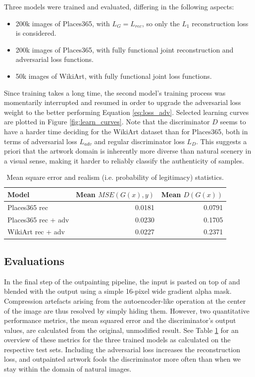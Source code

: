 \documentclass[twocolumn,showpacs,%
  nofootinbib,aps,superscriptaddress,%
  eqsecnum,prd,notitlepage,showkeys,10pt]{revtex4-1}
\begin{document}
\hspace{\parindent} Three models were trained and evaluated, differing in the following aspects:
\begin{itemize}
  \item 200k images of Places365, with $L_G = L_{rec}$, so only the $L_1$ reconstruction loss is considered.
  \item 200k images of Places365, with fully functional joint reconstruction and adversarial loss functions.
  \item 50k images of WikiArt, with fully functional joint loss functions.
\end{itemize}
Since training takes a long time, the second model's training process was momentarily interrupted and resumed in order to upgrade the adversarial loss weight to the better performing Equation \ref{eq:loss_adv}. Selected learning curves are plotted in Figure \ref{fig:learn_curves}. Note that the discriminator $D$ seems to have a harder time deciding for the WikiArt dataset than for Places365, both in terms of adversarial loss $L_{adv}$ and regular discriminator loss $L_D$. This suggests a priori that the artwork domain is inherently more diverse than natural scenery in a visual sense, making it harder to reliably classify the authenticity of samples.

\begin{table}[tp]
\centering
\begin{tabular}{l r r}
  \hline
  Model & Mean $MSE(G(x),y)$ & Mean $D(G(x))$ \\ \hline\hline
  Places365 rec & 0.0181 & 0.0791 \\
  Places365 rec + adv & 0.0230 & 0.1705 \\
  WikiArt rec + adv & 0.0227 & 0.2371 \\ \hline
\end{tabular}
\caption{Mean square error and realism (i.e. probability of legitimacy) statistics.}
\label{tab:quant}
\end{table}

\subsection{Evaluations}

\hspace{\parindent} In the final step of the outpainting pipeline, the input is pasted on top of and blended with the output using a simple 16-pixel wide gradient alpha mask. Compression artefacts arising from the autoencoder-like operation at the center of the image are thus resolved by simply hiding them. However, two quantitative performance metrics, the mean squared error and the discriminator's output values, are calculated from the original, unmodified result. See Table \ref{tab:quant} for an overview of these metrics for the three trained models as calculated on the respective test sets. Including the adversarial loss increases the reconstruction loss, and outpainted artwork fools the discriminator more often than when we stay within the domain of natural images.
\end{document}

